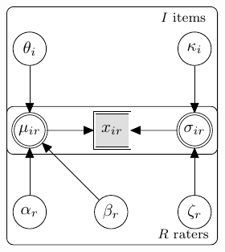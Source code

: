 \documentclass[a4paper,11pt]{article}
\begin{document}

\begin{figure}[!ht]
		\centering
		\includegraphics[width=\textwidth, page=8]{graphicalmodels.pdf}

\end{figure}
\end{document}
